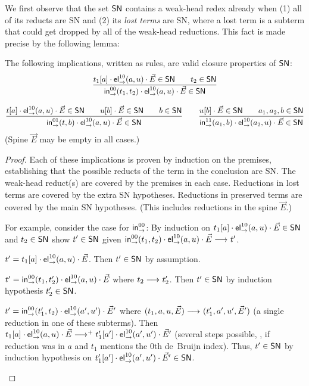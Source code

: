 We first observe that the set $\mathsf{SN}$ contains a weak-head
redex already when (1) all of its reducts are SN and (2) its \emph{lost terms}
are SN, where a lost term is a subterm that could get dropped by all of the
weak-head reductions.
This fact is made precise by the following lemma:
\begin{lemma}
  \label{lem:clos-sn}
  The following implications, written as rules, are valid closure
  properties of $\mathsf{SN}$:
\begin{gather*}
  \dfrac{t_1[a] \cdot \mathsf{el}_{\to}^{10}(a,u) \cdot \vec E \in \mathsf{SN}
      \qquad
      t_2 \in \mathsf{SN}
    }{\mathsf{in}_{\to}^{00}(t_1,t_2) \cdot \mathsf{el}_{\to}^{10}(a,u) \cdot \vec E \in \mathsf{SN}}
\\[2ex]
  \dfrac{t[a] \cdot \mathsf{el}_{\to}^{10}(a,u) \cdot \vec E \in \mathsf{SN}
      \qquad
      u[b] \cdot \vec E \in \mathsf{SN}
      \qquad
      b \in \mathsf{SN}
    }{\mathsf{in}_{\to}^{01}(t,b) \cdot \mathsf{el}_{\to}^{10}(a,u) \cdot \vec E \in \mathsf{SN}}
\qquad
  \dfrac{u[b] \cdot \vec E \in \mathsf{SN}
      \qquad
      a_1,a_2,b \in \mathsf{SN}
    }{\mathsf{in}_{\to}^{11}(a_1,b) \cdot \mathsf{el}_{\to}^{10}(a_2,u) \cdot \vec E \in \mathsf{SN}}
\end{gather*}
(Spine $\vec E$ may be empty in all cases.)
\end{lemma}
\begin{proof}
  Each of these implications is proven by induction on the premises,
  establishing that the possible reducts of the term in the conclusion
  are SN.
  The weak-head reduct(s) are covered by the premises in each case.
  Reductions in lost terms are covered by the extra SN hypotheses.
  Reductions in preserved terms are covered by the main SN hypotheses.
  (This includes reductions in the spine $\vec E$.)


  For example, consider the case for $\mathsf{in}_{\to}^{00}$:
  By induction on $t_1[a] \cdot \mathsf{el}_{\to}^{10}(a,u) \cdot \vec E \in \mathsf{SN}$
  and $t_2 \in \mathsf{SN}$ show $t' \in \mathsf{SN}$ given
  $\mathsf{in}_{\to}^{00}(t_1,t_2) \cdot \mathsf{el}_{\to}^{10}(a,u) \cdot \vec E \longrightarrow_{} t'$.
  \begin{caselist}

  \nextcase
  $t' = t_1[a] \cdot \mathsf{el}_{\to}^{10}(a,u) \cdot \vec E$.
  Then $t' \in \mathsf{SN}$ by assumption.

  \nextcase
  $t' = \mathsf{in}_{\to}^{00}(t_1,t_2') \cdot \mathsf{el}_{\to}^{10}(a,u) \cdot \vec E$
  where $t_2 \longrightarrow_{} t_2'$.
  Then $t' \in \mathsf{SN}$ by induction hypothesis $t_2' \in \mathsf{SN}$.

  \nextcase
  $t' = \mathsf{in}_{\to}^{00}(t_1',t_2) \cdot \mathsf{el}_{\to}^{10}(a',u') \cdot \vec E'$
  where $(t_1,a,u,\vec E) \longrightarrow_{} (t_1',a',u',\vec E')$ (a single
  reduction in one of these subterms).
  Then $t_1[a] \cdot \mathsf{el}_{\to}^{10}(a,u) \cdot \vec E \longrightarrow_{}^+
  t_1'[a'] \cdot \mathsf{el}_{\to}^{10}(a',u') \cdot \vec E'$ (several steps
  possible, \eg, if reduction was in $a$ and $t_1$ mentions the 0th
  de~Bruijn index).
  Thus, $t' \in \mathsf{SN}$ by induction hypothesis on
  $t_1'[a'] \cdot \mathsf{el}_{\to}^{10}(a',u') \cdot \vec E' \in \mathsf{SN}$.
  \popQED
  \end{caselist}
\end{proof}


